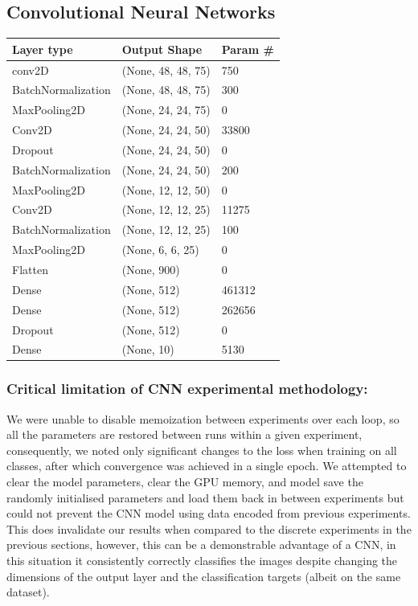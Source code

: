 \documentclass[11pt]{article}
\begin{document}
\subsection{Convolutional Neural Networks}
\begin{center}
  \begin{table}[h]
    \begin{tabular}{@{}lll@{}}
    \toprule
    Layer type & Output Shape & Param \# \\ \midrule
    conv2D & (None, 48, 48, 75) & 750 \\ \midrule
    BatchNormalization & (None, 48, 48, 75) & 300 \\ \midrule
    MaxPooling2D & (None, 24, 24, 75) & 0 \\ \midrule
    Conv2D & (None, 24, 24, 50) & 33800 \\ \midrule
    Dropout & (None, 24, 24, 50) & 0 \\ \midrule
    BatchNormalization & (None, 24, 24, 50) & 200 \\ \midrule
    MaxPooling2D & (None, 12, 12, 50) & 0 \\ \midrule
    Conv2D & (None, 12, 12, 25) & 11275 \\ \midrule
    BatchNormalization & (None, 12, 12, 25) & 100 \\ \midrule
    MaxPooling2D & (None, 6, 6, 25) & 0 \\ \midrule
    Flatten & (None, 900) & 0 \\ \midrule
    Dense & (None, 512) & 461312 \\ \midrule
    Dense & (None, 512) & 262656 \\ \midrule
    Dropout & (None, 512) & 0 \\ \midrule
    Dense & (None, 10) & 5130 \\ \bottomrule
    \end{tabular}
  \end{table}
 \end{center} 
\subsubsection{Critical limitation of CNN experimental methodology:}
We were unable to disable memoization between experiments over each loop, so all the parameters are restored between runs within a given experiment, consequently, we noted only significant changes to the loss when training on all classes, after which convergence was achieved in a single epoch. We attempted to clear the model parameters, clear the GPU memory, and model save the randomly initialised parameters and load them back in between experiments but could not prevent the CNN model using data encoded from previous experiments. This does invalidate our results when compared to the discrete experiments in the previous sections, however, this can be a demonstrable advantage of a CNN, in this situation it consistently correctly classifies the images despite changing the dimensions of the output layer and the classification targets (albeit on the same dataset).
\end{document}
